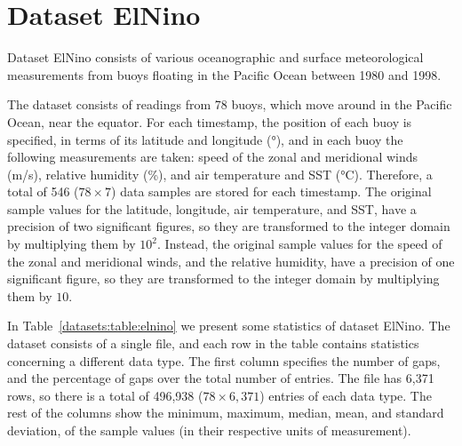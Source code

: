 
\clearpage
\section{Dataset ElNino}
\label{datasets:elnino}

Dataset ElNino \cite{dataset:elnino} consists of various oceanographic and surface meteorological measurements from buoys floating in the Pacific Ocean between 1980 and 1998. \TAODef


The dataset consists of readings from 78 buoys, which move around in the Pacific Ocean, near the equator. For each timestamp, the position of each buoy is specified, in terms of its latitude and longitude (°), and in each buoy the following measurements are taken: speed of the zonal and meridional winds (m/s), relative humidity (\%), and air temperature and SST (°C). Therefore, a total of 546 ($78\times7$) data samples are stored for each timestamp. The original sample values for the latitude, longitude, air temperature, and SST, have a precision of two significant figures, so they are transformed to the integer domain by multiplying them by $10^2$. Instead, the original sample values for the speed of the zonal and meridional winds, and the relative humidity, have a precision of one significant figure, so they are transformed to the integer domain by multiplying them by $10$.


In Table~\ref{datasets:table:elnino} we present some statistics of dataset ElNino. The dataset consists of a single file, and each row in the table contains statistics concerning a different data type. The first column specifies the number of gaps, and the percentage of gaps over the total number of entries. The file has 6,371 rows, so there is a total of 496,938 ($78\times6,371$) entries of each data type. The rest of the columns show the minimum, maximum, median, mean, and standard deviation, of the sample values (in their respective units of measurement).




